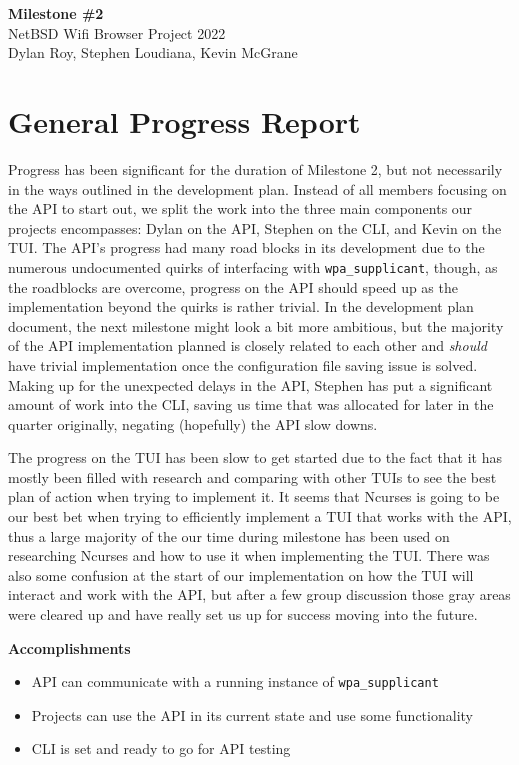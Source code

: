 \documentclass[11pt]{article}
\begin{document}
\begin{center}
  \textbf{\Large Milestone \#2}\\\large NetBSD Wifi Browser Project 2022\\
  Dylan Roy, Stephen Loudiana, Kevin McGrane
\end{center}


\section{General Progress Report}
Progress has been significant for the duration of Milestone 2, but not necessarily in the ways outlined
in the development plan. Instead of all members focusing on the API to start out, we split the work into
the three main components our projects encompasses: Dylan on the API, Stephen on the CLI, and Kevin on the TUI.
The API's progress had many road blocks in its development due to the numerous undocumented quirks of interfacing
with \texttt{wpa\_supplicant}, though, as the roadblocks are overcome, progress on the API should speed up
as the implementation beyond the quirks is rather trivial. In the development plan document, the next milestone
might look a bit more ambitious, but the majority of the API implementation planned is closely related to each
other and \textit{should} have trivial implementation once the configuration file saving issue is solved.
Making up for the unexpected delays in the API, Stephen has put a significant amount of work into the CLI, saving 
us time that was allocated for later in the quarter originally, negating (hopefully) the API slow downs.

The progress on the TUI has been slow to get started due to the fact that it has mostly been filled with research 
and comparing with other TUIs to see the best plan of action when trying to implement it. It seems that Ncurses 
is going to be our best bet when trying to efficiently implement a TUI that works with the API, thus a large majority 
of the our time during milestone has been used on researching Ncurses and how to use it when implementing the TUI. 
There was also some confusion at the start of our implementation on how the TUI will interact and work with the API, 
but after a few group discussion those gray areas were cleared up and have really set us up for success moving into 
the future.

\textbf{Accomplishments}
\begin{itemize}
  \item API can communicate with a running instance of \texttt{wpa\_supplicant}
  \item Projects can use the API in its current state and use some functionality
  \item CLI is set and ready to go for API testing 
\end{itemize}
\end{document}
